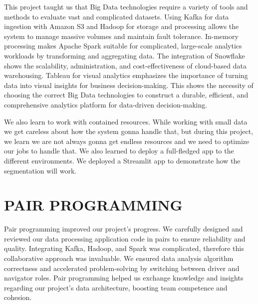 \documentclass[conference]{IEEEtran}
\begin{document}
This project taught us that Big Data technologies require a variety of tools and methods to evaluate vast and complicated datasets. Using Kafka for data ingestion with Amazon S3 and Hadoop for storage and processing allows the system to manage massive volumes and maintain fault tolerance. In-memory processing makes Apache Spark suitable for complicated, large-scale analytics workloads by transforming and aggregating data. The integration of Snowflake shows the scalability, administration, and cost-effectiveness of cloud-based data warehousing. Tableau for visual analytics emphasizes the importance of turning data into visual insights for business decision-making. This shows the necessity of choosing the correct Big Data technologies to construct a durable, efficient, and comprehensive analytics platform for data-driven decision-making.

We also learn to work with contained resources. While working with small data we get careless about how the system gonna handle that, but during this project, we learn we are not always gonna get endless resources and we need to optimize our jobs to handle that. We also learned to deploy a full-fledged app to the different environments. We deployed a Streamlit app to demonstrate how the segmentation will work.




\section{PAIR PROGRAMMING}
Pair programming improved our project's progress. We carefully designed and reviewed our data processing application code in pairs to ensure reliability and quality. Integrating Kafka, Hadoop, and Spark was complicated, therefore this collaborative approach was invaluable. We ensured data analysis algorithm correctness and accelerated problem-solving by switching between driver and navigator roles. Pair programming helped us exchange knowledge and insights regarding our project's data architecture, boosting team competence and cohesion.




\end{document}
